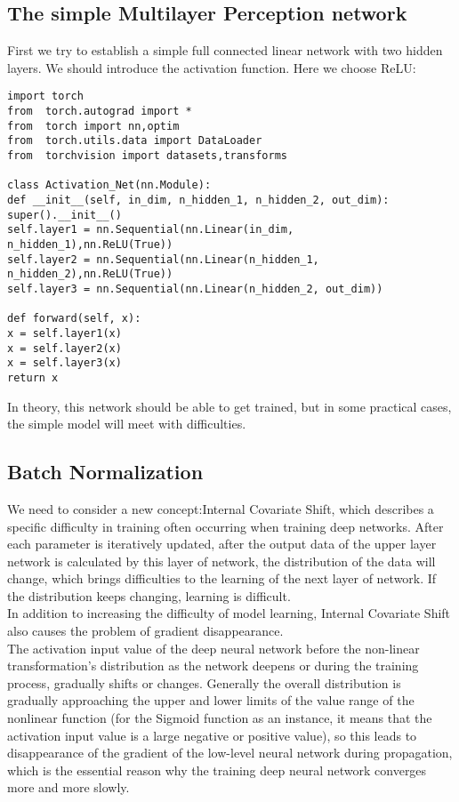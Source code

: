 \documentclass{article}
\begin{document}
\subsection{The simple Multilayer Perception network}
First we try to establish a simple full connected linear network with two hidden layers. We should introduce the activation function. Here we choose ReLU:

\begin{verbatim}
import torch
from  torch.autograd import *
from  torch import nn,optim
from  torch.utils.data import DataLoader
from  torchvision import datasets,transforms

class Activation_Net(nn.Module):
def __init__(self, in_dim, n_hidden_1, n_hidden_2, out_dim):
super().__init__()
self.layer1 = nn.Sequential(nn.Linear(in_dim, n_hidden_1),nn.ReLU(True))
self.layer2 = nn.Sequential(nn.Linear(n_hidden_1, n_hidden_2),nn.ReLU(True))
self.layer3 = nn.Sequential(nn.Linear(n_hidden_2, out_dim))

def forward(self, x):
x = self.layer1(x)
x = self.layer2(x)
x = self.layer3(x)
return x
\end{verbatim}

In theory, this network should be able to get trained, but in some practical cases, the simple model will meet with difficulties.

\subsection{Batch Normalization}

We need to consider a new concept:Internal Covariate Shift, which describes a specific difficulty in training often occurring when training deep networks.
After each parameter is iteratively updated, after the output data of the upper layer network is calculated by this layer of network, the distribution of the data will change, which brings difficulties to the learning of the next layer of network. If the distribution keeps changing, learning is difficult.\\

In addition to increasing the difficulty of model learning, Internal Covariate Shift also causes the problem of gradient disappearance. \\

The activation input value of the deep neural network before the non-linear transformation's distribution as the network deepens or during the training process, gradually shifts or changes. Generally the overall distribution is gradually approaching the upper and lower limits of the value range of the nonlinear function (for the Sigmoid function as an instance, it means that the activation input value is a large negative or positive value), so this leads to disappearance of 
the gradient of the low-level neural network during propagation, which is the essential reason why the training deep neural network converges more and more slowly.\\
\end{document}
